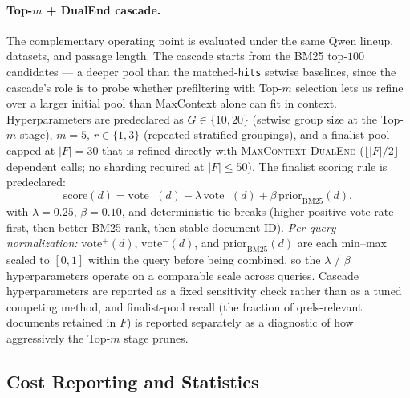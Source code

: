 \paragraph{Top-$m$ + DualEnd cascade.}
The complementary operating point is evaluated under the same Qwen lineup,
datasets, and passage length. The cascade starts from the BM25 top-$100$
candidates --- a deeper pool than the matched-\texttt{hits} setwise
baselines, since the cascade's role is to probe whether prefiltering with
Top-$m$ selection lets us refine over a larger initial pool than MaxContext
alone can fit in context. Hyperparameters are predeclared as $G \in \{10,
20\}$ (setwise group size at the Top-$m$ stage), $m{=}5$, $r \in \{1, 3\}$
(repeated stratified groupings), and a finalist pool capped at $|F|{=}30$
that is refined directly with \textsc{MaxContext-DualEnd}
($\lfloor |F|/2 \rfloor$ dependent calls; no sharding required at
$|F|{\le}50$). The finalist scoring rule is predeclared:
\[
\mathrm{score}(d) = \mathrm{vote}^+(d) - \lambda \,\mathrm{vote}^-(d) + \beta \,\mathrm{prior}_{\mathrm{BM25}}(d),
\]
with $\lambda{=}0.25$, $\beta{=}0.10$, and deterministic tie-breaks (higher
positive vote rate first, then better BM25 rank, then stable document ID).
\textit{Per-query normalization:} $\mathrm{vote}^+(d)$,
$\mathrm{vote}^-(d)$, and $\mathrm{prior}_{\mathrm{BM25}}(d)$ are each
min--max scaled to $[0,1]$ within the query before being combined, so the
$\lambda$ / $\beta$ hyperparameters operate on a comparable scale across
queries. Cascade hyperparameters are reported as a fixed sensitivity check
rather than as a tuned competing method, and finalist-pool recall (the
fraction of qrels-relevant documents retained in $F$) is reported
separately as a diagnostic of how aggressively the Top-$m$ stage prunes.

\subsection{Cost Reporting and Statistics}

